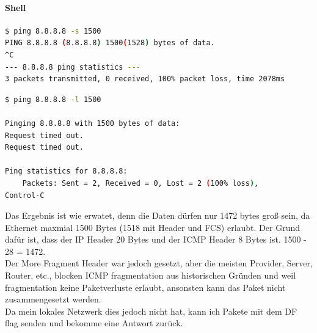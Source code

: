 \paragraph{Shell}
\begin{lstlisting}[language=Bash, caption=Linux ping with More Fragment]
$ ping 8.8.8.8 -s 1500
PING 8.8.8.8 (8.8.8.8) 1500(1528) bytes of data.
^C
--- 8.8.8.8 ping statistics ---
3 packets transmitted, 0 received, 100% packet loss, time 2078ms
\end{lstlisting}
\begin{lstlisting}[language=Bash, caption=Window ping with More Fragment]
$ ping 8.8.8.8 -l 1500

Pinging 8.8.8.8 with 1500 bytes of data:
Request timed out.
Request timed out.

Ping statistics for 8.8.8.8:
    Packets: Sent = 2, Received = 0, Lost = 2 (100% loss),
Control-C
\end{lstlisting}
\noindent
Das Ergebnis ist wie erwatet, denn die Daten dürfen nur 1472 bytes groß sein, da Ethernet maxmial 1500 Bytes (1518 mit Header und FCS) erlaubt. Der Grund dafür ist, dass der IP Header 20 Bytes und der ICMP Header 8 Bytes ist. 1500 - 28 = 1472.\\
Der More Fragment Header war jedoch gesetzt, aber die meisten Provider, Server, Router, etc., blocken ICMP fragmentation aus historischen Gründen und weil fragmentation keine Paketverluste erlaubt, ansonsten kann das Paket nicht zusammengesetzt werden.\\
Da mein lokales Netzwerk dies jedoch nicht hat, kann ich Pakete mit dem DF flag senden und bekomme eine Antwort zurück.
